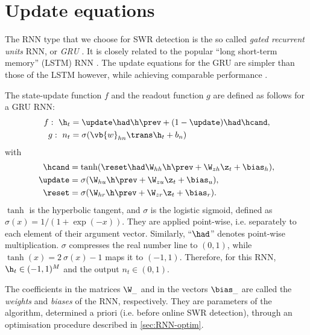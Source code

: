 \section{Update equations}
\label{sec:GRU_eqs}

The RNN type that we choose for SWR detection is the so called \emph{gated recurrent units} RNN, or \emph{GRU} \cite{Cho2014}. It is closely related to the popular ``long short-term memory'' (LSTM) RNN \cite{Hochreiter1997,Greff2017}. The update equations for the GRU are simpler than those of the LSTM however, while achieving comparable performance \cite{Chung2014}.

The state-update function $f$ and the readout function $g$ are defined as follows for a GRU RNN:
%
\begin{align}
f:\ \h_t     &= \update \had \h\prev 
                + (1-\update) \had \hcand, \label{eq:hnew}\\
g:\ n_t  &= \sigma( \vb{w}_{hn}\trans \h_t + b_n )      \label{eq:out}
\end{align}
with
\begin{align}
\hcand  &= \tanh( \reset \had \W_{hh} \h\prev 
                   + \W_{zh} \z_t + \bias_h ),  \label{eq:hcand}\\
\update &= \sigma( \W_{hu} \h\prev 
                   + \W_{zu} \z_t + \bias_u),   \label{eq:update}\\
\reset  &= \sigma( \W_{hr} \h\prev 
                   + \W_{zr} \z_t + \bias_r ).  \label{eq:reset}
\end{align}
$\tanh$ is the hyperbolic tangent, and $\sigma$ is the logistic sigmoid, defined as $\sigma(x) = 1 / (1 + \exp(-x))$. They are applied point-wise, i.e. separately to each element of their argument vector. Similarly, ``$\had$'' denotes point-wise multiplication.  $\sigma$ compresses the real number line to $(0, 1)$, while $\tanh(x) = 2\ \sigma(x) - 1$ maps it to $(-1, 1)$. Therefore, for this RNN, $\h_t \in (-1, 1)^M$ and the output $n_t \in (0, 1)$.

The coefficients in the matrices $\W_\_$ and in the vectors $\bias_\_$ are called the \emph{weights} and \emph{biases} of the RNN, respectively.\footnotemark{} They are parameters of the algorithm, determined a priori (i.e. before online SWR detection), through an optimisation procedure described in \cref{sec:RNN-optim}.


